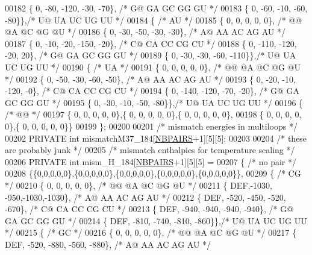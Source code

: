 \begin{DoxyCode}
00182    \{   0,  -80, -120,  -30,  -70\}, \textcolor{comment}{/* G@  GA  GC  GG  GU */}
00183    \{   0,  -60,  -10,  -60,  -80\}\},\textcolor{comment}{/* U@  UA  UC  UG  UU */}
00184   \{ \textcolor{comment}{/* AU */}
00185    \{   0,    0,    0,    0,    0\}, \textcolor{comment}{/* @@  @A  @C  @G  @U */}
00186    \{   0,  -30,  -50,  -30,  -30\}, \textcolor{comment}{/* A@  AA  AC  AG  AU */}
00187    \{   0,  -10,  -20, -150,  -20\}, \textcolor{comment}{/* C@  CA  CC  CG  CU */}
00188    \{   0, -110, -120,  -20,   20\}, \textcolor{comment}{/* G@  GA  GC  GG  GU */}
00189    \{   0,  -30,  -30,  -60, -110\}\},\textcolor{comment}{/* U@  UA  UC  UG  UU */}
00190   \{ \textcolor{comment}{/* UA */}
00191    \{   0,    0,    0,    0,    0\}, \textcolor{comment}{/* @@  @A  @C  @G  @U */}
00192    \{   0,  -50,  -30,  -60,  -50\}, \textcolor{comment}{/* A@  AA  AC  AG  AU */}
00193    \{   0,  -20,  -10, -120,   -0\}, \textcolor{comment}{/* C@  CA  CC  CG  CU */}
00194    \{   0, -140, -120,  -70,  -20\}, \textcolor{comment}{/* G@  GA  GC  GG  GU */}
00195    \{   0,  -30,  -10,  -50,  -80\}\},\textcolor{comment}{/* U@  UA  UC  UG  UU */}
00196   \{ \textcolor{comment}{/* @@ */}
00197    \{  0,  0,  0,  0,  0\},\{  0,  0,  0,  0,  0\},\{  0,  0,  0,  0,  0\},
00198    \{  0,  0,  0,  0,  0\},\{  0,  0,  0,  0,  0\}\}
00199 \};
00200 
00201 \textcolor{comment}{/* mismatch energies in multiloops */}
00202 PRIVATE \textcolor{keywordtype}{int} mismatchM37\_184[\hyperlink{constants_8h_a5e75221c779d618eab81e096f37e32ce}{NBPAIRS}+1][5][5];
00203 
00204 \textcolor{comment}{/* these are probably junk */}
00205 \textcolor{comment}{/* mismatch enthalpies for temperature scaling */}
00206 PRIVATE \textcolor{keywordtype}{int} mism\_H\_184[\hyperlink{constants_8h_a5e75221c779d618eab81e096f37e32ce}{NBPAIRS}+1][5][5] =
00207 \{ \textcolor{comment}{/* no pair */}
00208   \{\{0,0,0,0,0\},\{0,0,0,0,0\},\{0,0,0,0,0\},\{0,0,0,0,0\},\{0,0,0,0,0\}\},
00209   \{ \textcolor{comment}{/* CG */}
00210    \{   0,    0,    0,    0,    0\}, \textcolor{comment}{/* @@  @A  @C  @G  @U */}
00211    \{ DEF,-1030, -950,-1030,-1030\}, \textcolor{comment}{/* A@  AA  AC  AG  AU */}
00212    \{ DEF, -520, -450, -520, -670\}, \textcolor{comment}{/* C@  CA  CC  CG  CU */}
00213    \{ DEF, -940, -940, -940, -940\}, \textcolor{comment}{/* G@  GA  GC  GG  GU */}
00214    \{ DEF, -810, -740, -810, -860\}\},\textcolor{comment}{/* U@  UA  UC  UG  UU */}
00215   \{ \textcolor{comment}{/* GC */}
00216    \{   0,    0,    0,    0,    0\}, \textcolor{comment}{/* @@  @A  @C  @G  @U */}
00217    \{ DEF, -520, -880, -560, -880\}, \textcolor{comment}{/* A@  AA  AC  AG  AU */}

\end{DoxyCode}
